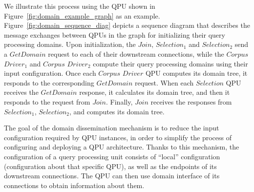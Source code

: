 We illustrate this process using the QPU shown in Figure~\ref{fig:domain_example_graph} as an example.
Figure~\ref{fig:domain_sequence_diag} depicts a sequence diagram that describes the message exchanges between QPUs in the graph
for initializing their query processing domains.
Upon initialization, the $Join$, $Selection_1$ and $Selection_2$ send a $GetDomain$ request to each of their downstream
connections,
while the $Corpus$ $Driver_1$ and $Corpus$ $Driver_2$ compute their query processing domains using their input configuration.
Once each $Corpus$ $Driver$ QPU computes its domain tree, it responds to the corresponding $GetDomain$ request.
When each $Selection$ QPU receives the $GetDomain$ response, it calculates its domain tree, and then it responds to the request from $Join$.
Finally, $Join$ receives the responses from $Selection_1$, $Selection_2$, and computes its domain tree.

\medskip
\noindent
The goal of the domain dissemination mechanism is to reduce the input configuration required by QPU instances,
in order to simplify the process of configuring and deploying a QPU architecture.
Thanks to this mechanism, the configuration of a query processing unit consists of ``local'' configuration
(configuration about that specific QPU), as well as the endpoints of its downstream connections.
The QPU can then use domain interface of its connections to obtain information about them.

